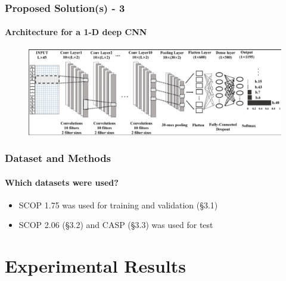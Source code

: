 \documentclass[xcolor={usenames,dvipsnames},hyperref={hyperindex,bookmarks}]{beamer}
\begin{document}
\frame
{
	\frametitle{Proposed Solution(s) - 3}
	\framesubtitle{Architecture for a 1-D deep CNN}


	\begin{figure}[h]
	\centering 
	\includegraphics[height=1.5in]{./pics/1-d-cnn-architecture}
	\label{fig:1DdeepCNNarch}
	\end{figure}
}









\frame
{
	\frametitle{Dataset and Methods}
	\framesubtitle{Which datasets were used?}

	\begin{itemize}
	\item SCOP 1.75 was used for training and validation (\S3.1)
	\item SCOP 2.06 (\S3.2) and CASP (\S3.3) was used for test
	\end{itemize}
}














\section{Experimental Results}
\end{document}
